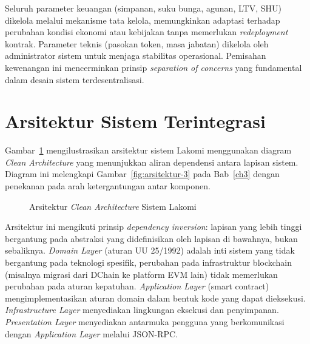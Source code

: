 Seluruh parameter keuangan (simpanan, suku bunga, agunan, LTV, SHU) dikelola melalui mekanisme tata kelola, memungkinkan adaptasi terhadap perubahan kondisi ekonomi atau kebijakan tanpa memerlukan \textit{redeployment} kontrak. Parameter teknis (pasokan token, masa jabatan) dikelola oleh administrator sistem untuk menjaga stabilitas operasional. Pemisahan kewenangan ini mencerminkan prinsip \textit{separation of concerns} yang fundamental dalam desain sistem terdesentralisasi.

\section{Arsitektur Sistem Terintegrasi}

Gambar~\ref{fig:clean-architecture} mengilustrasikan arsitektur sistem Lakomi menggunakan diagram \textit{Clean Architecture} yang menunjukkan aliran dependensi antara lapisan sistem. Diagram ini melengkapi Gambar~\ref{fig:arsitektur-3} pada Bab~\ref{ch3} dengan penekanan pada arah ketergantungan antar komponen.

\begin{figure}[H]
\centering
{}
\caption{Arsitektur \textit{Clean Architecture} Sistem Lakomi}
\label{fig:clean-architecture}
\end{figure}

Arsitektur ini mengikuti prinsip \textit{dependency inversion}: lapisan yang lebih tinggi bergantung pada abstraksi yang didefinisikan oleh lapisan di bawahnya, bukan sebaliknya. \textit{Domain Layer} (aturan UU 25/1992) adalah inti sistem yang tidak bergantung pada teknologi spesifik, perubahan pada infrastruktur blockchain (misalnya migrasi dari DChain ke platform EVM lain) tidak memerlukan perubahan pada aturan kepatuhan. \textit{Application Layer} (smart contract) mengimplementasikan aturan domain dalam bentuk kode yang dapat dieksekusi. \textit{Infrastructure Layer} menyediakan lingkungan eksekusi dan penyimpanan. \textit{Presentation Layer} menyediakan antarmuka pengguna yang berkomunikasi dengan \textit{Application Layer} melalui JSON-RPC.

